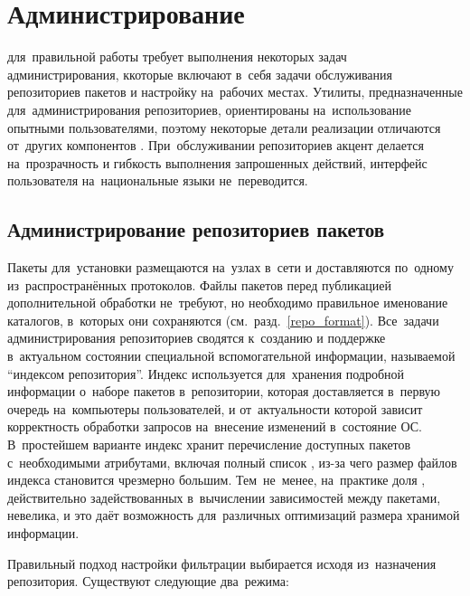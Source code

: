 
\section{Администрирование \ds}

\ds для~правильной работы требует выполнения некоторых задач администрирования,
ккоторые включают в~себя задачи обслуживания репозиториев пакетов 
и настройку \ds на~рабочих местах.
Утилиты, предназначенные для~администрирования репозиториев, ориентированы на~использование опытными пользователями,
поэтому некоторые детали реализации отличаются от~других компонентов \ds.
При~обслуживании репозиториев акцент делается на~прозрачность и гибкость выполнения запрошенных действий,
интерфейс пользователя на~национальные языки не~переводится.

\subsection{Администрирование репозиториев пакетов}

Пакеты для~установки размещаются на~узлах в~сети и доставляются по~одному из~распространённых протоколов.
Файлы пакетов перед публикацией дополнительной обработки не~требуют,
но необходимо правильное именование каталогов, в~которых они сохраняются (см.~разд.~\ref{repo_format}).
Все~задачи администрирования репозиториев сводятся к~созданию и поддержке в~актуальном состоянии специальной вспомогательной информации,
называемой ``индексом  репозитория''.
Индекс используется для~хранения подробной информации о~наборе пакетов в~репозитории, 
которая доставляется  в~первую очередь  на~компьютеры пользователей,
и от~актуальности которой  зависит корректность обработки запросов на~внесение изменений в~состояние ОС.
В~простейшем варианте индекс хранит перечисление доступных пакетов с~необходимыми атрибутами,
включая полный список \provides, из-за чего размер файлов индекса становится чрезмерно большим.
Тем~не~менее, на~практике доля \provides, действительно задействованных в~вычислении зависимостей между пакетами, невелика,
и это даёт возможность для~различных оптимизаций размера хранимой информации.

Правильный подход настройки фильтрации \provides выбирается исходя из~назначения репозитория.
Существуют следующие два~режима:


